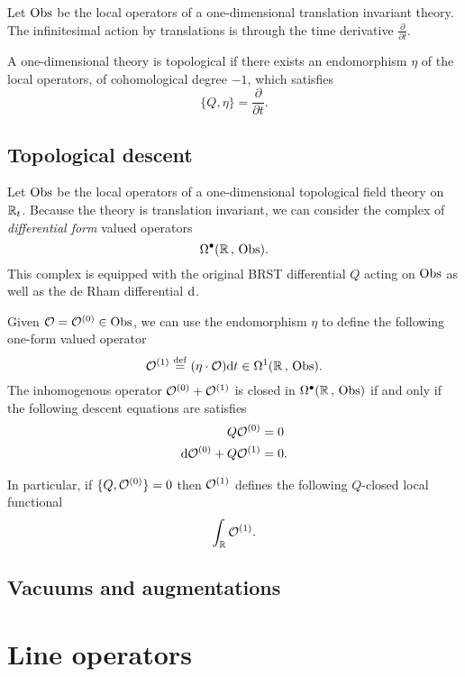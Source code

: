 \documentclass[11pt]{amsart}
\def\define{\overset{\rm def}{=}}
\begin{document}
Let ${\rm Obs}$ be the local operators of a one-dimensional translation invariant theory. 
The infinitesimal action by translations is through the time derivative $\frac{\partial}{\partial t}$. 

A one-dimensional theory is topological if there exists an endomorphism $\eta$ of the local operators, of cohomological degree $-1$, which satisfies
\[
\{Q, \eta\} = \frac{\partial}{\partial t} .
\]


\subsection{Topological descent} 

Let ${\rm Obs}$ be the local operators of a one-dimensional topological field theory on $\mathbb R_t$. 
Because the theory is translation invariant, we can consider the complex of {\em differential form} valued operators
\[
\Omega^\bullet(\mathbb R \, , \, {\rm Obs}) .
\]
This complex is equipped with the original BRST differential $Q$ acting on ${\rm Obs}$ as well as the de Rham differential ${\rm d}$. 

Given $\mathcal O = \mathcal O^{(0)} \in {\rm Obs}$, we can use the endomorphism $\eta$ to define the following one-form valued operator
\[
\cO^{(1)} \define (\eta \cdot \cO) \d t \in \Omega^1(\RR \, , \, \Obs).
\]
The inhomogenous operator $\mathcal O^{(0)} + \mathcal O^{(1)}$ is closed in $\Omega^\bullet(\mathbb R \, , \, {\rm Obs})$ if and only if the following descent equations are satisfies
\begin{align*}
Q \mathcal O^{(0)} & = 0 \\
{\rm d} \mathcal O^{(0)} + Q \mathcal O^{(1)} & = 0 .
\end{align*}

In particular, if $\{Q,\mathcal O^{(0)}\} = 0$ then $\mathcal O^{(1)}$ defines the following $Q$-closed local functional
\[
\int_\mathbb R \mathcal O^{(1)} .
\]


\subsection{Vacuums and augmentations}


\section{Line operators}
\end{document}

